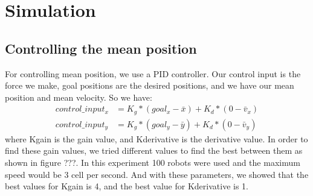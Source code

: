 
\section{Simulation}\label{sec:simulation}

\subsection{Controlling the mean position}

For controlling mean position, we use a PID controller. Our control input is the force we make, goal positions are the desired positions, and we have our mean position and mean velocity. So we have:
\begin{align}
control\_input_x &= K_{g}*(goal_x - \bar{x}) + K_{d}*(0-\bar{v}_x) \nonumber\\
control\_input_y &= K_{g}*(goal_y - \bar{y}) + K_{d}*(0-\bar{v}_y) 
\end{align}
where Kgain is the gain value, and Kderivative is the derivative value. In order to find these gain values, we tried different values to find the best between them as shown in figure ???.
In this experiment 100 robots were used and the maximum speed would be 3 cell per second. And with these parameters, we showed that the best values for Kgain is 4, and the best value for Kderivative is 1.










